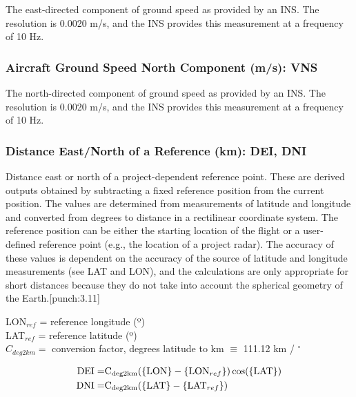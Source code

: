 \documentclass[
  english,
]{book}
\begin{document}
The east-directed component of ground speed as provided by an INS. The resolution is 0.0020 m/s, and the INS provides this measurement at a frequency of 10 Hz.

\hypertarget{vns}{%
\subsubsection*{Aircraft Ground Speed North Component (m/s): VNS}\label{vns}}

The north-directed component of ground speed as provided by an INS. The resolution is 0.0020 m/s, and the INS provides this measurement at a frequency of 10 Hz.

\hypertarget{dei-dni}{%
\subsubsection*{Distance East/North of a Reference (km): DEI, DNI}\label{dei-dni}}

Distance east or north of a project-dependent reference point. These are derived outputs obtained by subtracting a fixed reference position from the current position. The values are determined from measurements of latitude and longitude and converted from degrees to distance in a rectilinear coordinate system. The reference position can be either the starting location of the flight or a user-defined reference point (e.g., the location of a project radar). The accuracy of these values is dependent on the accuracy of the source of latitude and longitude measurements (see LAT and LON), and the calculations are only appropriate for short distances because they do not take into account the spherical geometry of the Earth.\protect\hypertarget{punch:3.11}{}{{[}punch:3.11{]}}

LON\(_{ref}\) = reference longitude (º)\\
LAT\(_{ref}\) = reference latitude (º)\\
\(C_{deg2km}=\) conversion factor, degrees latitude to km
\(\equiv\) 111.12 km / \(^{\circ}\)

\begin{equation}
\begin{split}
\mathrm{DEI} = & \mathrm{C_{deg2km}}(\mathrm{\{LON\}}-\{\mathrm{LON}_{ref}\})\cos(\mathrm{\{LAT\}}) \notag \\ 
\mathrm{DNI} = & \mathrm{C_{deg2km}}(\mathrm{\{LAT\}}-\{\mathrm{LAT}_{ref}\})  
\end{split}
\label{eq:DNSEW}
\end{equation}
\end{document}
